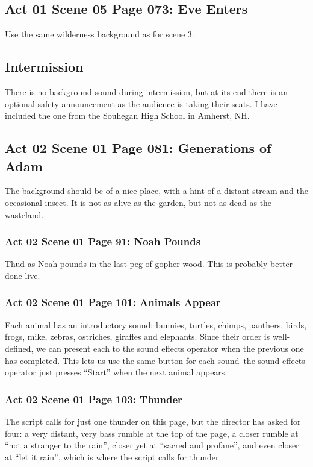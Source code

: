 \documentclass[letterpaper,twoside]{article}
\begin{document}
\subsection{Act 01 Scene 05 Page 073: Eve Enters}
Use the same wilderness background as for scene 3.

\subsection{Intermission}
There is no background sound during intermission, but at its end
there is an optional safety announcement
as the audience is taking their seats.  I have included the one
from the Souhegan High School in Amherst, NH.

\subsection{Act 02 Scene 01 Page 081: Generations of Adam}
The background should be of a nice place, with a hint of a distant
stream and the occasional insect.  It is not as alive as the garden,
but not as dead as the wasteland.

\subsubsection{Act 02 Scene 01 Page 91: Noah Pounds}
Thud as Noah pounds in the last peg of gopher wood.
This is probably better done live.

\subsubsection{Act 02 Scene 01 Page 101: Animals Appear}
Each animal has an introductory sound: bunnies, turtles, chimps,
panthers, birds, frogs, mike, zebras, ostriches, giraffes and elephants.
Since their order is well-defined, we can present each to the sound
effects operator when the previous one has completed.  This lets us
use the same button for each sound--the sound effects operator
just presses ``Start'' when the next animal appears.

\subsubsection{Act 02 Scene 01 Page 103: Thunder}
The script calls for just one thunder on this page, but the director
has asked for four: a very distant, very bass rumble at the top
of the page, a closer rumble at ``not a stranger to the rain'',
closer yet at ``sacred and profane'', and even closer at ``let it rain'',
which is where the script calls for thunder.
\end{document}
